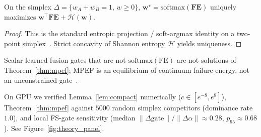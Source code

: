 \begin{theorem}
\label{thm:mpef}
On the simplex \(\Delta=\{w_A+w_B=1,\,w\ge0\}\), \(\mathbf{w}^\star=\mathrm{softmax}(\mathbf{FE})\) uniquely maximizes \(\mathbf{w}^\top\mathbf{FE}+\mathcal{H}(\mathbf{w})\).
\end{theorem}
\begin{proof}
This is the standard entropic projection / soft-argmax identity on a two-point simplex~\cite{boyd2004convex}. Strict concavity of Shannon entropy \(\mathcal{H}\) yields uniqueness.
\end{proof}

\begin{corollary}
\label{cor:gatefuse}
Scalar learned fusion gates that are not \(\mathrm{softmax}(\mathrm{FE})\) are not solutions of Theorem~\ref{thm:mpef}; MPEF is an equilibrium of continuum failure energy, not an unconstrained gate~\cite{islam2024digate,panda2025sparsefusion}.
\end{corollary}

\begin{remark}
On GPU we verified Lemma~\ref{lem:compact} numerically (\(c\in[e^{-8},e^{8}]\)), Theorem~\ref{thm:mpef} against \(5000\) random simplex competitors (dominance rate \(1.0\)), and local FS-gate sensitivity (median \(\|\Delta\mathrm{gate}\|/\|\Delta\alpha\|\approx0.28\), \(p_{95}\approx0.68\)). See Figure~\ref{fig:theory_panel}.
\end{remark}

